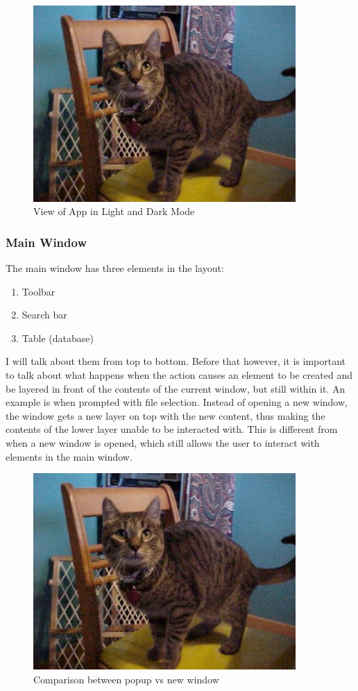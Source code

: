\begin{figure}[htb]
	\centering
	\includegraphics[width=10cm]{./Images/cats_00001.jpg}
	\caption{View of App in Light and Dark Mode}
	\label{fig:AppLD}
\end{figure}

\subsubsection{Main Window}

The main window has three elements in the layout:
\begin{enumerate}
	\item Toolbar
	\item Search bar
	\item Table (database)
\end{enumerate}

I will talk about them from top to bottom.
Before that however, it is important to talk about what happens when
the action causes an element to be created and be layered in front of
the contents of the current window, but still within it. An example is when
prompted with file selection. Instead of opening a new window, the
window gets a new layer on top with the new content, thus making the
contents of the lower layer unable to be interacted with. This is
different from when a new window is opened, which still allows the
user to interact with elements in the main window.

\begin{figure}[htb]
	\centering
	\includegraphics[width=10cm]{./Images/cats_00001.jpg}
	\caption{Comparison between popup vs new window}
	\label{fig:DBOperations}
\end{figure}

